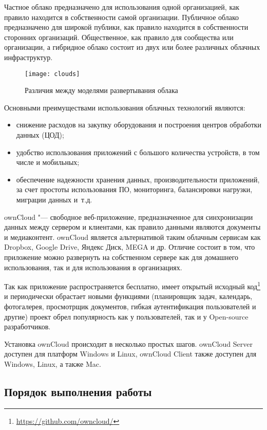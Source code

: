 Частное облако предназначено для использования одной организацией, как правило находится в собственности самой организации.
Публичное облако предназначено для широкой публики, как правило находится в собственности сторонних организаций.
Общественное, как правило для сообщества или организации, а гибридное облако состоит из двух или более различных облачных инфраструктур.

\begin{figure}[ht]
    \centering
	\texttt{[image: clouds]}
	\caption{Различия между моделями развертывания облака}\label{pic:clouds}
\end{figure}

Основными преимуществами использования облачных технологий являются:
\begin{itemize}
    \item снижение расходов на закупку оборудования и построения центров обработки данных (ЦОД);
    \item удобство использования приложений с большого количества устройств, в том числе и мобильных;
    \item обеспечение надежности хранения данных, производительности приложений, за счет простоты использования ПО, мониторинга, балансировки нагрузки, миграции данных и~т.д.
\end{itemize}

ownCloud "--- свободное веб-приложение, предназначенное для синхронизации данных между сервером и клиентами, как правило данными являются документы и медиаконтент.
ownCloud является альтернативой таким облачным сервисам как Dropbox, Google Drive, Яндекс Диск, MEGA и др.
Отличие состоит в том, что приложение можно развернуть на собственном сервере как для домашнего использования, так и для использования в организациях.

Так как приложение распространяется бесплатно, имеет открытый исходный код\footnote{\url{https://github.com/owncloud/}} и периодически обрастает новыми функциями (планировщик задач, календарь, фотогалерея, просмотрщик документов, гибкая аутентификация пользователей и другие) проект обрел популярность как у пользователей, так и у Open-source разработчиков.

Установка ownCloud происходит в несколько простых шагов.
ownCloud Server доступен для платформ Windows и Linux, ownCloud Client также доступен для Windows, Linux, а также Mac.

\subsection{Порядок выполнения работы}

